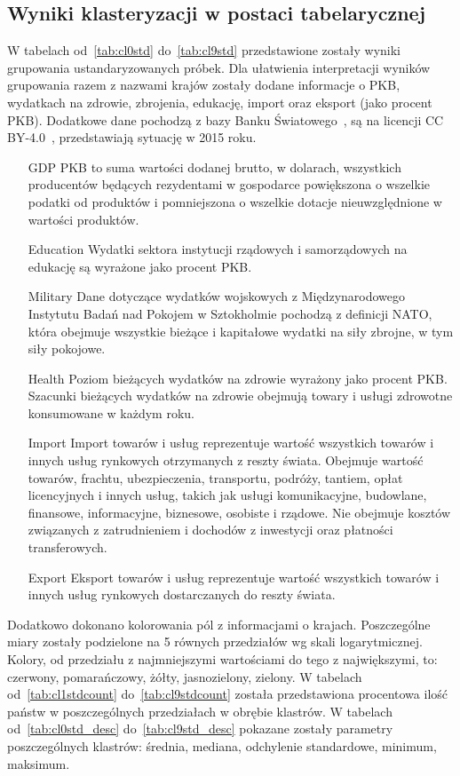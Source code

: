 \documentclass[11pt]{report}
\begin{document}
    \subsection{Wyniki klasteryzacji w postaci tabelarycznej}
    W tabelach od~\ref{tab:cl0std} do~\ref{tab:cl9std} przedstawione zostały wyniki grupowania ustandaryzowanych próbek.
    Dla ułatwienia interpretacji wyników grupowania razem z nazwami krajów zostały dodane informacje o PKB, wydatkach na zdrowie, zbrojenia, edukację, import oraz eksport (jako procent PKB).
    Dodatkowe dane pochodzą z bazy Banku Światowego~\cite{worldbank}, są na licencji CC BY-4.0~\cite{wblicense}, przedstawiają sytuację w 2015 roku.
    \begin{enumerate}
        \item[GDP] PKB to suma wartości dodanej brutto, w dolarach, wszystkich producentów będących rezydentami w gospodarce powiększona o wszelkie podatki od produktów i pomniejszona o wszelkie dotacje nieuwzględnione w wartości produktów.
        \item[Education] Wydatki sektora instytucji rządowych i samorządowych na edukację są wyrażone jako procent PKB.
        \item[Military] Dane dotyczące wydatków wojskowych z Międzynarodowego Instytutu Badań nad Pokojem w Sztokholmie pochodzą z definicji NATO, która obejmuje wszystkie bieżące i kapitałowe wydatki na siły zbrojne, w tym siły pokojowe.
        \item[Health] Poziom bieżących wydatków na zdrowie wyrażony jako procent PKB. Szacunki bieżących wydatków na zdrowie obejmują towary i usługi zdrowotne konsumowane w każdym roku.
        \item[Import] Import towarów i usług reprezentuje wartość wszystkich towarów i innych usług rynkowych otrzymanych z reszty świata.
        Obejmuje wartość towarów, frachtu, ubezpieczenia, transportu, podróży, tantiem, opłat licencyjnych i innych usług, takich jak usługi komunikacyjne, budowlane, finansowe, informacyjne, biznesowe, osobiste i rządowe.
        Nie obejmuje kosztów związanych z zatrudnieniem i dochodów z inwestycji oraz płatności transferowych.
        \item[Export] Eksport towarów i usług reprezentuje wartość wszystkich towarów i innych usług rynkowych dostarczanych do reszty świata.
    \end{enumerate}
    Dodatkowo dokonano kolorowania pól z informacjami o krajach.
    Poszczególne miary zostały podzielone na 5 równych przedziałów wg skali logarytmicznej.
    Kolory, od przedziału z najmniejszymi wartościami do tego z największymi, to: czerwony, pomarańczowy, żółty, jasnozielony, zielony.
    W tabelach od~\ref{tab:cl1stdcount} do~\ref{tab:cl9stdcount} została przedstawiona procentowa ilość państw w poszczególnych przedziałach w obrębie klastrów.
    W tabelach od~\ref{tab:cl0std_desc} do~\ref{tab:cl9std_desc} pokazane zostały parametry poszczególnych klastrów: średnia, mediana, odchylenie standardowe, minimum, maksimum.
\end{document}
